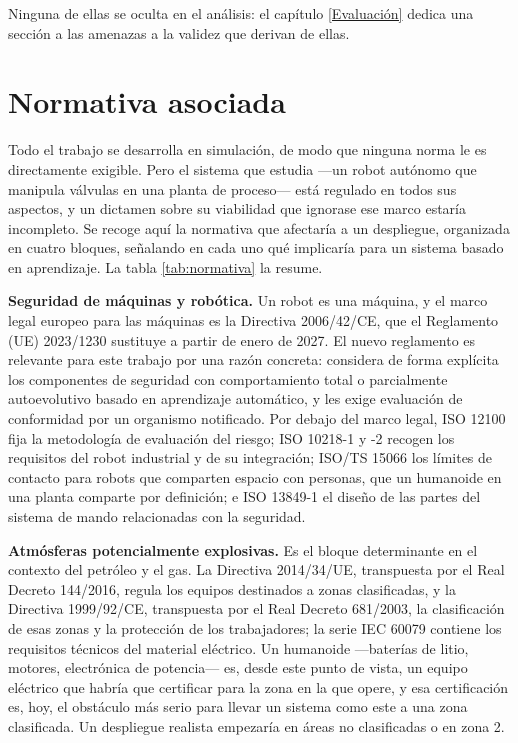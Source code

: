 Ninguna de ellas se oculta en el análisis: el capítulo \ref{Evaluación} dedica una sección a las
amenazas a la validez que derivan de ellas.


\section{Normativa asociada}

Todo el trabajo se desarrolla en simulación, de modo que ninguna norma le es directamente exigible.
Pero el sistema que estudia —un robot autónomo que manipula válvulas en una planta de proceso— está
regulado en todos sus aspectos, y un dictamen sobre su viabilidad que ignorase ese marco estaría
incompleto. Se recoge aquí la normativa que afectaría a un despliegue, organizada en cuatro bloques,
señalando en cada uno qué implicaría para un sistema basado en aprendizaje. La tabla
\ref{tab:normativa} la resume.

\textbf{Seguridad de máquinas y robótica.} Un robot es una máquina, y el marco legal europeo para las
máquinas es la Directiva 2006/42/CE, que el Reglamento (UE) 2023/1230 sustituye a partir de enero de
2027. El nuevo reglamento es relevante para este trabajo por una razón concreta: considera de forma
explícita los componentes de seguridad con comportamiento total o parcialmente autoevolutivo basado
en aprendizaje automático, y les exige evaluación de conformidad por un organismo notificado. Por
debajo del marco legal, ISO 12100 fija la metodología de evaluación del riesgo; ISO 10218-1 y -2
recogen los requisitos del robot industrial y de su integración; ISO/TS 15066 los límites de
contacto para robots que comparten espacio con personas, que un humanoide en una planta comparte
por definición; e ISO 13849-1 el diseño de las partes del sistema de mando relacionadas con la
seguridad.

\textbf{Atmósferas potencialmente explosivas.} Es el bloque determinante en el contexto del petróleo
y el gas. La Directiva 2014/34/UE, transpuesta por el Real Decreto 144/2016, regula los equipos
destinados a zonas clasificadas, y la Directiva 1999/92/CE, transpuesta por el Real Decreto
681/2003, la clasificación de esas zonas y la protección de los trabajadores; la serie IEC 60079
contiene los requisitos técnicos del material eléctrico. Un humanoide —baterías de litio, motores,
electrónica de potencia— es, desde este punto de vista, un equipo eléctrico que habría que certificar
para la zona en la que opere, y esa certificación es, hoy, el obstáculo más serio para llevar un
sistema como este a una zona clasificada. Un despliegue realista empezaría en áreas no clasificadas
o en zona 2.

